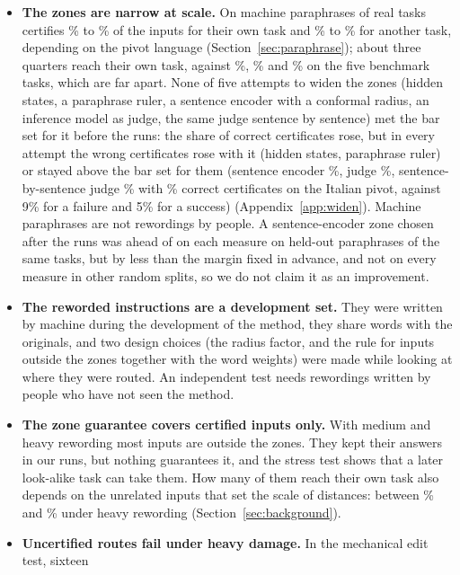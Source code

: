 \begin{itemize}
  \item \textbf{The zones are narrow at scale.} On machine paraphrases of \WidenTasksEval{} real tasks \cert{} certifies \WidenRefTfivePLow{}\% to \WidenRefTfivePHigh{}\% of the inputs for their own task and \WidenRefTfiveMLow{}\% to \WidenRefTfiveMHigh{}\% for another task,
  depending on the pivot language (Section~\ref{sec:paraphrase}); about three quarters reach their own task, against \FiveCertRightLight{}\%, \FiveCertRightMedium{}\% and \FiveCertRightHeavy{}\% on the five benchmark tasks, which are far apart. None of five attempts
  to widen the zones (hidden states, a paraphrase ruler, a sentence encoder with a conformal radius, an inference model as judge, the same judge sentence by sentence) met the bar set for it before the runs: the share of correct certificates rose, but in every attempt the wrong certificates rose with it
  (hidden states, paraphrase ruler) or stayed above the bar set for them (sentence encoder \WidenEncPrimM{}\%, judge \WidenJudgeFrM{}\%, sentence-by-sentence judge \WidenSentItM{}\% with \WidenSentItP{}\% correct certificates on the Italian pivot, against 9\% for a failure and 5\% for a success)
  (Appendix~\ref{app:widen}). Machine paraphrases are not rewordings by people. A sentence-encoder zone chosen after the runs was ahead of \cert{}
  on each measure on held-out paraphrases of the same tasks, but by less than the margin fixed in advance, and not on every measure in other random splits, so we do not claim it as an improvement.
  \item \textbf{The reworded instructions are a development set.} They were written by machine during
  the development of the method, they share words with the originals, and two design
  choices (the radius factor, and the rule for inputs outside the zones together with the word
  weights) were made while looking at where they were routed. An independent test needs rewordings
  written by people who have not seen the method.
  \item \textbf{The zone guarantee covers certified inputs only.} With medium and heavy rewording most
  inputs are outside the zones. They kept their answers in our runs, but nothing guarantees it, and
  the stress test shows that a later look-alike task can take them. How many of them reach their
  own task also depends on the unrelated inputs that set the scale of distances: between
  \BackgroundHeavyLow{}\% and \BackgroundHeavyHigh{}\% under heavy rewording
  (Section~\ref{sec:background}).
  \item \textbf{Uncertified routes fail under heavy damage.} In the mechanical edit test, sixteen

\end{itemize}
